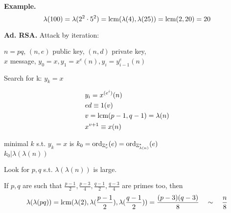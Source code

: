 \textbf{Example.}
\[
  \lambda(100) = \lambda(2^2 \cdot 5^2) = \operatorname{lcm}(\lambda(4), \lambda(25)) = \operatorname{lcm}(2,20) = 20
\]

\textbf{Ad. RSA.}
Attack by iteration:

$n = pq$, $(n,e)$ public key, $(n,d)$ private key, \\
$x$ message, $y_0 = x, y_1 = x^e (n), y_i = y_{i-1}^{e} (n)$

Search for k: $y_k = x$

\begin{align*}
  &y_i = x^{(e^i)} (n) \\
  &ed \equiv 1 (v) \\
  &v = \operatorname{lcm}(p-1, q-1) = \lambda(n) \\
  &x ^{v+1} \equiv x (n)
\end{align*}

minimal $k$ s.t. $ y_k = x$ is $k_0 = \operatorname{ord}_{\mathbb{Z}_v^{*}}(e) = \operatorname{ord}_{\mathbb{Z}_{\lambda(n)}^{*}}(e)$ \\
$k_0 | \lambda(\lambda(n))$

Look for $p,q$ s.t. $\lambda(\lambda(n))$ is large.

If $p,q$ are such that $\frac{p-1}{2}, \frac{p-3}{4}, \frac{q-1}{2}, \frac{q-3}{4}$ are primes too, 
then 
\begin{align*}
  \lambda(\lambda(pq)) = \operatorname{lcm}(\lambda(2), \lambda( \frac{p-1}{2} ), \lambda( \frac{q-1}{2} )) = \frac{(p-3)(q-3)}{8} \quad \sim \quad \frac{n}{8}
\end{align*}















